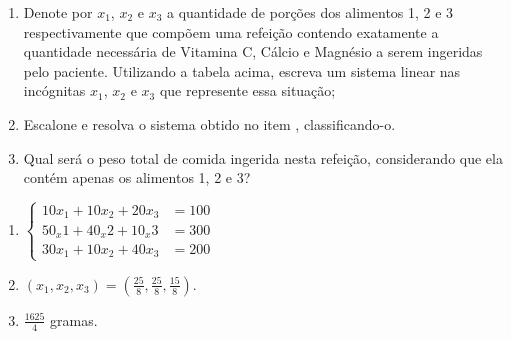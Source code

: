 \documentclass[10 pt,usenames,dvipsnames, oneside]{article}
\begin{document}
\begin{enumerate}
\item{}
Denote por $x_1$, $x_2$ e $x_3$ a quantidade de porções dos alimentos 1, 2 e 3 respectivamente que compõem uma refeição contendo exatamente a quantidade necessária de Vitamina C, Cálcio e Magnésio a serem ingeridas pelo paciente. Utilizando a tabela acima, escreva um sistema linear nas incógnitas $x_1$, $x_2$ e $x_3$ que represente essa situação;

\item{}

Escalone e resolva o sistema obtido no item , classificando-o.

\item{}
Qual será o peso total de comida ingerida nesta refeição, considerando que ela contém apenas os alimentos 1, 2 e 3? 

\end{enumerate}

\ifdefined\prof
\clearpage
\begin{solucao}

\begin{enumerate}
\item 
$
\left \{
\begin{aligned}
10x_1+10x_2+20x_3&=100\\
50_x1+40_x2+10_x3&=300\\
30x_1+10x_2+40x_3&=200
\end{aligned}
\right.  
$
\item $\displaystyle(x_1,x_2,x_3)=(\frac{25}{8},\frac{25}{8},\frac{15}{8})$.
\item $\displaystyle\frac{1625}{4}$ gramas.
\end{enumerate}

\end{solucao}
\fi
\end{document}
